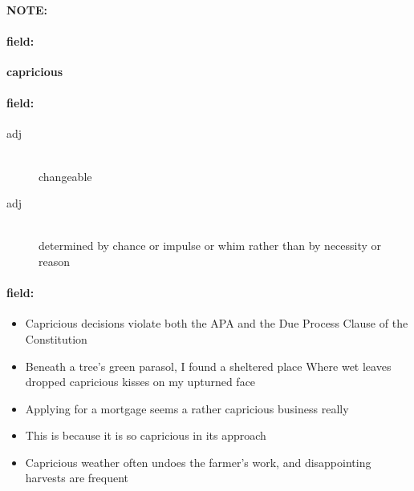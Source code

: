 \documentclass[12pt]{article}
\newenvironment{note}{\paragraph{NOTE:}}{}
\newenvironment{field}{\paragraph{field:}}{}
\begin{document}
\begin{note}
\begin{field}
\textbf{\large capricious}
\end{field}


\begin{field}
\begin{description}
\item[adj] \hfill \\ 
changeable

\item[adj] \hfill \\ 
determined by chance or impulse or whim rather than by necessity or reason

\end{description}
\end{field}

\begin{field}
\begin{itemize}
\item Capricious decisions violate both the APA and the Due Process Clause of the Constitution
\item Beneath a tree's green parasol, I found a sheltered place Where wet leaves dropped capricious kisses on my upturned face
\item Applying for a mortgage seems a rather capricious business really
\item This is because it is so capricious in its approach
\item Capricious weather often undoes the farmer's work, and disappointing harvests are frequent
\end{itemize}
\end{field}
\end{note}
\end{document}
